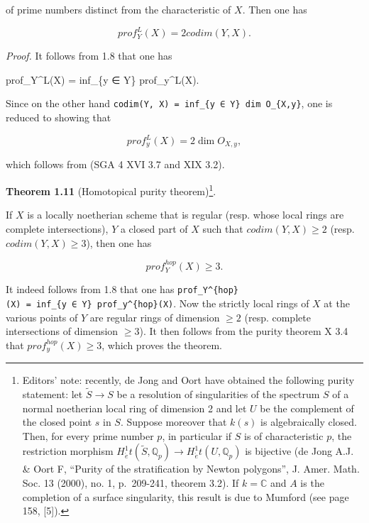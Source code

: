 \documentclass[
]{article}
\newenvironment{Shaded}{}{}
\newcommand{\NormalTok}[1]{#1}
\begin{document}
of prime numbers distinct from the characteristic of \(X\). Then one has

\[
prof^{L}_{Y}(X) = 2 codim(Y, X).
\]

\emph{Proof.} It follows from 1.8 that one has

\begin{Shaded}
\begin{Highlighting}[]
\NormalTok{prof\_Y\^{}L(X) = inf\_\{y ∈ Y\} prof\_y\^{}L(X).}
\end{Highlighting}
\end{Shaded}

Since on the other hand
\texttt{codim(Y,\ X)\ =\ inf\_\{y\ ∈\ Y\}\ dim\ O\_\{X,y\}}, one is
reduced to showing that

\[
prof^{L}_{y}(X) = 2 \dim O_{X,y},
\]

which follows from (SGA 4 XVI 3.7 and XIX 3.2).

\textbf{Theorem 1.11} (Homotopical purity theorem)\footnote{Editors'
  note: recently, de Jong and Oort have obtained the following purity
  statement: let \(\tilde{S} \to S\) be a resolution of singularities of
  the spectrum \(S\) of a normal noetherian local ring of dimension 2
  and let \(U\) be the complement of the closed point \(s\) in \(S\).
  Suppose moreover that \(k(s)\) is algebraically closed. Then, for
  every prime number \(p\), in particular if \(S\) is of characteristic
  \(p\), the restriction morphism
  \(H^{1}_{\acute{e}}t(\tilde{S}, \mathbb{Q}_{p}) \to H^{1}_{\acute{e}}t(U, \mathbb{Q}_{p})\)
  is bijective (de Jong A.J. \& Oort F, ``Purity of the stratification
  by Newton polygons'', J. Amer. Math. Soc. 13 (2000), no. 1,
  p.~209-241, theorem 3.2). If \(k = \mathbb{C}\) and \(A\) is the
  completion of a surface singularity, this result is due to Mumford
  (see page 158, {[}5{]}).}.

If \(X\) is a locally noetherian scheme that is regular (resp. whose
local rings are complete intersections), \(Y\) a closed part of \(X\)
such that \(codim(Y, X) \geqslant 2\) (resp.
\(codim(Y, X) \geqslant 3\)), then one has

\[
prof^{hop}_{Y}(X) \geqslant 3.
\]

It indeed follows from 1.8 that one has
\texttt{prof\_Y\^{}\{hop\}(X)\ =\ inf\_\{y\ ∈\ Y\}\ prof\_y\^{}\{hop\}(X)}.
Now the strictly local rings of \(X\) at the various points of \(Y\) are
regular rings of dimension \(\geqslant 2\) (resp. complete intersections
of dimension \(\geqslant 3\)). It then follows from the purity theorem X
3.4 that \(prof^{hop}_{y}(X) \geqslant 3\), which proves the theorem.
\end{document}

